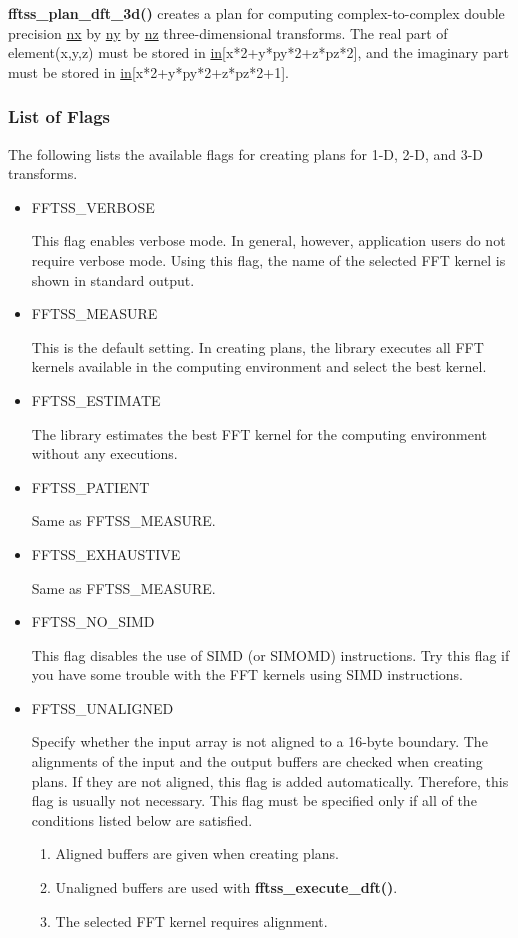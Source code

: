 \documentclass{article}
\begin{document}
{\bf fftss\_plan\_dft\_3d()} creates a plan for computing complex-to-complex
double precision \underline{nx} by \underline{ny} by \underline{nz} three-dimensional transforms.
The real part of element(x,y,z) must be stored in 
\underline{in}[x*2+y*py*2+z*pz*2],
and the imaginary part must be stored in \underline{in}[x*2+y*py*2+z*pz*2+1]. 

\subsubsection{List of Flags}
 The following lists the available flags for creating plans
 for 1-D, 2-D, and 3-D transforms.

\begin{itemize}
\item{FFTSS\_VERBOSE}

This flag enables verbose mode.
In general, however, application users do not require verbose mode.
Using this flag, the name of the selected FFT kernel is shown in standard output.

\item{FFTSS\_MEASURE}

This is the default setting. In creating plans, the library executes all FFT kernels
 available in the computing environment and select the best kernel.

\item{FFTSS\_ESTIMATE}

The library estimates the best FFT kernel for the computing environment
 without any executions.

\item{FFTSS\_PATIENT}

Same as FFTSS\_MEASURE.

\item{FFTSS\_EXHAUSTIVE}

Same as FFTSS\_MEASURE.

\item{FFTSS\_NO\_SIMD}

This flag disables the use of SIMD (or SIMOMD) instructions.
Try this flag if you have some trouble with the FFT kernels 
using SIMD instructions.

\item{FFTSS\_UNALIGNED}

Specify whether the input array is not aligned to a 16-byte boundary.
The alignments of the input and the output buffers are checked
when creating plans. If they are not aligned, this flag is added automatically.
Therefore, this flag is usually not necessary.
This flag must be specified only if all of the conditions listed below are
satisfied.
\begin{enumerate}
\item{Aligned buffers are given when creating plans.}
\item{Unaligned buffers are used with {\bf fftss\_execute\_dft()}.}
\item{The selected FFT kernel requires alignment.}
\end{enumerate}


\end{itemize}
\end{document}
